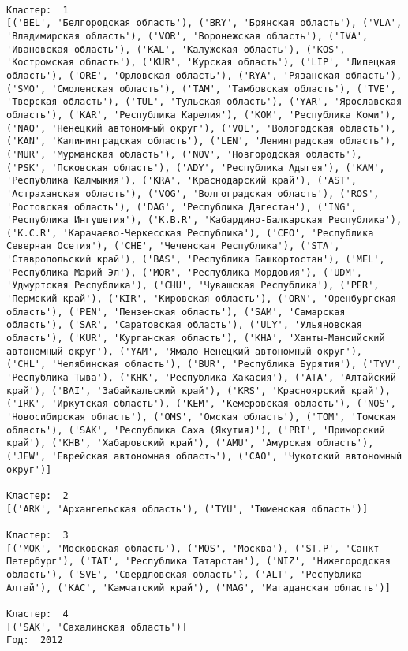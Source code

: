 \documentclass[11pt]{article}
\begin{document}
    \begin{Verbatim}[commandchars=\\\{\}]

Кластер:  1
[('BEL', 'Белгородская область'), ('BRY', 'Брянская область'), ('VLA', 'Владимирская область'), ('VOR', 'Воронежская область'), ('IVA', 'Ивановская область'), ('KAL', 'Калужская область'), ('KOS', 'Костромская область'), ('KUR', 'Курская область'), ('LIP', 'Липецкая область'), ('ORE', 'Орловская область'), ('RYA', 'Рязанская область'), ('SMO', 'Смоленская область'), ('TAM', 'Тамбовская область'), ('TVE', 'Тверская область'), ('TUL', 'Тульская область'), ('YAR', 'Ярославская область'), ('KAR', 'Республика Карелия'), ('KOM', 'Республика Коми'), ('NAO', 'Ненецкий автономный округ'), ('VOL', 'Вологодская область'), ('KAN', 'Калинингpадская область'), ('LEN', 'Ленинградская область'), ('MUR', 'Мурманская область'), ('NOV', 'Новгородская область'), ('PSK', 'Псковская область'), ('ADY', 'Республика Адыгея'), ('KAM', 'Республика Калмыкия'), ('KRA', 'Краснодарский край'), ('AST', 'Астраханская область'), ('VOG', 'Волгоградская область'), ('ROS', 'Ростовская область'), ('DAG', 'Республика Дагестан'), ('ING', 'Республика Ингушетия'), ('K.B.R', 'Кабардино-Балкарская Республика'), ('K.C.R', 'Карачаево-Черкесская Республика'), ('CEO', 'Республика Северная Осетия'), ('CHE', 'Чеченская Республика'), ('STA', 'Ставропольский край'), ('BAS', 'Республика Башкортостан'), ('MEL', 'Республика Марий Эл'), ('MOR', 'Республика Мордовия'), ('UDM', 'Удмуртская Республика'), ('CHU', 'Чувашская Республика'), ('PER', 'Пермский край'), ('KIR', 'Кировская область'), ('ORN', 'Оренбургская область'), ('PEN', 'Пензенская область'), ('SAM', 'Самарская область'), ('SAR', 'Саратовская область'), ('ULY', 'Ульяновская область'), ('KUR', 'Курганская область'), ('KHA', 'Ханты-Мансийский автономный округ'), ('YAM', 'Ямало-Ненецкий автономный округ'), ('CHL', 'Челябинская область'), ('BUR', 'Республика Бурятия'), ('TYV', 'Республика Тыва'), ('KHK', 'Республика Хакасия'), ('ATA', 'Алтайский край'), ('BAI', 'Забайкальский край'), ('KRS', 'Красноярский край'), ('IRK', 'Иркутская область'), ('KEM', 'Кемеровская область'), ('NOS', 'Новосибирская область'), ('OMS', 'Омская область'), ('TOM', 'Томская область'), ('SAK', 'Республика Саха (Якутия)'), ('PRI', 'Приморский край'), ('KHB', 'Хабаровский край'), ('AMU', 'Амурская область'), ('JEW', 'Еврейская автономная область'), ('CAO', 'Чукотский автономный округ')]

Кластер:  2
[('ARK', 'Архангельская область'), ('TYU', 'Тюменская область')]

Кластер:  3
[('MOK', 'Московская область'), ('MOS', 'Москва'), ('ST.P', 'Санкт-Петербург'), ('TAT', 'Республика Татарстан'), ('NIZ', 'Нижегородская область'), ('SVE', 'Свердловская область'), ('ALT', 'Республика Алтай'), ('KAC', 'Камчатский край'), ('MAG', 'Магаданская область')]

Кластер:  4
[('SAK', 'Сахалинская область')]
Год:  2012

    \end{Verbatim}
\end{document}
